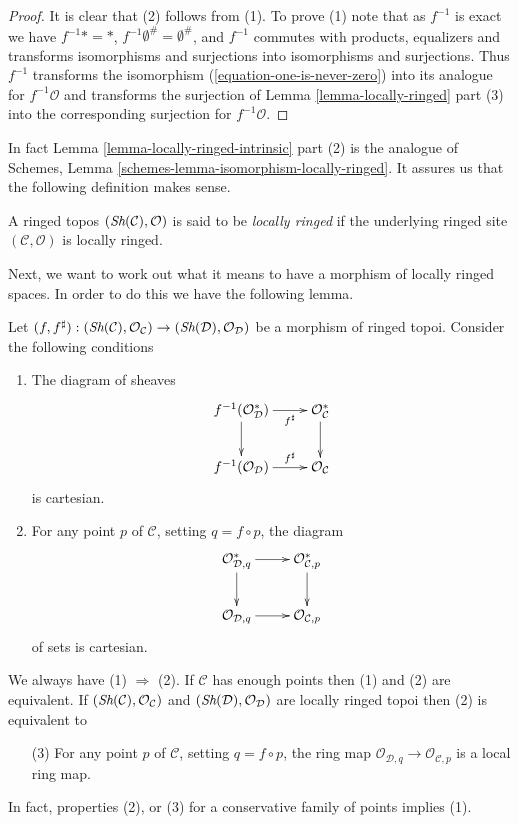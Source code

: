 \begin{proof}
It is clear that (2) follows from (1). To prove (1) note that
as $f^{-1}$ is exact we have $f^{-1}* = *$,
$f^{-1}\emptyset^\# = \emptyset^\#$, and $f^{-1}$ commutes with
products, equalizers and transforms isomorphisms and surjections
into isomorphisms and surjections. Thus $f^{-1}$ transforms the
isomorphism (\ref{equation-one-is-never-zero}) into
its analogue for $f^{-1}\mathcal{O}$ and transforms the surjection of
Lemma \ref{lemma-locally-ringed} part (3)
into the corresponding surjection for $f^{-1}\mathcal{O}$.
\end{proof}

\noindent
In fact
Lemma \ref{lemma-locally-ringed-intrinsic} part (2)
is the analogue of
Schemes, Lemma \ref{schemes-lemma-isomorphism-locally-ringed}.
It assures us that the following definition makes sense.

\begin{definition}
\label{definition-locally-ringed-topos}
A ringed topos $(\mathop{\textit{Sh}}\nolimits(\mathcal{C}), \mathcal{O})$ is said to be
{\it locally ringed} if the underlying ringed site
$(\mathcal{C}, \mathcal{O})$ is locally ringed.
\end{definition}

\noindent
Next, we want to work out what it means to have a morphism of locally ringed
spaces. In order to do this we have the following lemma.

\begin{lemma}
\label{lemma-locally-ringed-morphism}
Let
$(f, f^\sharp) : (\mathop{\textit{Sh}}\nolimits(\mathcal{C}), \mathcal{O}_\mathcal{C})
\to (\mathop{\textit{Sh}}\nolimits(\mathcal{D}), \mathcal{O}_\mathcal{D})$
be a morphism of ringed topoi.
Consider the following conditions
\begin{enumerate}
\item The diagram of sheaves
$$
\xymatrix{
f^{-1}(\mathcal{O}^*_\mathcal{D}) \ar[r]_-{f^\sharp} \ar[d] &
\mathcal{O}^*_\mathcal{C} \ar[d] \\
f^{-1}(\mathcal{O}_\mathcal{D}) \ar[r]^-{f^\sharp} &
\mathcal{O}_\mathcal{C}
}
$$
is cartesian.
\item For any point $p$ of $\mathcal{C}$, setting $q = f \circ p$,
the diagram
$$
\xymatrix{
\mathcal{O}^*_{\mathcal{D}, q} \ar[r] \ar[d] &
\mathcal{O}^*_{\mathcal{C}, p} \ar[d] \\
\mathcal{O}_{\mathcal{D}, q} \ar[r] &
\mathcal{O}_{\mathcal{C}, p}
}
$$
of sets is cartesian.
\end{enumerate}
We always have (1) $\Rightarrow$ (2). If $\mathcal{C}$ has enough points
then (1) and (2) are equivalent. If
$(\mathop{\textit{Sh}}\nolimits(\mathcal{C}), \mathcal{O}_\mathcal{C})$
and
$(\mathop{\textit{Sh}}\nolimits(\mathcal{D}), \mathcal{O}_\mathcal{D})$
are locally ringed topoi then (2) is equivalent to
\begin{enumerate}
\item[(3)] For any point $p$ of $\mathcal{C}$, setting $q = f \circ p$,
the ring map $\mathcal{O}_{\mathcal{D}, q} \to \mathcal{O}_{\mathcal{C}, p}$
is a local ring map.
\end{enumerate}
In fact, properties (2), or (3) for a conservative
family of points implies (1).
\end{lemma}

